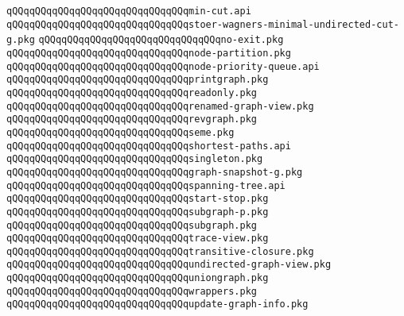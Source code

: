 \verb|qQQqqQQqqQQqqQQqqQQqqQQqqQQqqQQqmin-cut.api|\newline
\verb|qQQqqQQqqQQqqQQqqQQqqQQqqQQqqQQqstoer-wagners-minimal-undirected-cut-g.pkg|\newline
\verb|qQQqqQQqqQQqqQQqqQQqqQQqqQQqqQQqno-exit.pkg|\newline
\verb|qQQqqQQqqQQqqQQqqQQqqQQqqQQqqQQqnode-partition.pkg|\newline
\verb|qQQqqQQqqQQqqQQqqQQqqQQqqQQqqQQqnode-priority-queue.api|\newline
\verb|qQQqqQQqqQQqqQQqqQQqqQQqqQQqqQQqprintgraph.pkg|\newline
\verb|qQQqqQQqqQQqqQQqqQQqqQQqqQQqqQQqreadonly.pkg|\newline
\verb|qQQqqQQqqQQqqQQqqQQqqQQqqQQqqQQqrenamed-graph-view.pkg|\newline
\verb|qQQqqQQqqQQqqQQqqQQqqQQqqQQqqQQqrevgraph.pkg|\newline
\verb|qQQqqQQqqQQqqQQqqQQqqQQqqQQqqQQqseme.pkg|\newline
\verb|qQQqqQQqqQQqqQQqqQQqqQQqqQQqqQQqshortest-paths.api|\newline
\verb|qQQqqQQqqQQqqQQqqQQqqQQqqQQqqQQqsingleton.pkg|\newline
\verb|qQQqqQQqqQQqqQQqqQQqqQQqqQQqqQQqgraph-snapshot-g.pkg|\newline
\verb|qQQqqQQqqQQqqQQqqQQqqQQqqQQqqQQqspanning-tree.api|\newline
\verb|qQQqqQQqqQQqqQQqqQQqqQQqqQQqqQQqstart-stop.pkg|\newline
\verb|qQQqqQQqqQQqqQQqqQQqqQQqqQQqqQQqsubgraph-p.pkg|\newline
\verb|qQQqqQQqqQQqqQQqqQQqqQQqqQQqqQQqsubgraph.pkg|\newline
\verb|qQQqqQQqqQQqqQQqqQQqqQQqqQQqqQQqtrace-view.pkg|\newline
\verb|qQQqqQQqqQQqqQQqqQQqqQQqqQQqqQQqtransitive-closure.pkg|\newline
\verb|qQQqqQQqqQQqqQQqqQQqqQQqqQQqqQQqundirected-graph-view.pkg|\newline
\verb|qQQqqQQqqQQqqQQqqQQqqQQqqQQqqQQquniongraph.pkg|\newline
\verb|qQQqqQQqqQQqqQQqqQQqqQQqqQQqqQQqwrappers.pkg|\newline
\verb|qQQqqQQqqQQqqQQqqQQqqQQqqQQqqQQqupdate-graph-info.pkg|\newline

